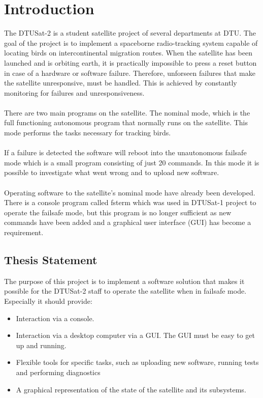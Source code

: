\chapter{Introduction}

The DTUSat-2 is a student satellite project of several departments at DTU. The goal of the project is to implement a spaceborne radio-tracking system capable of locating birds on intercontinental migration routes.
When the satellite has been launched and is orbiting earth, it is practically impossible to press a reset button in case of a hardware or software failure. Therefore, unforseen failures that make the satellite unresponsive, must be handled. This is achieved by constantly monitoring for failures and unresponsiveness.
\\ \\
There are two main programs on the satellite. The nominal mode, which is the full functioning autonomous program that normally runs on the satellite. This mode performs the tasks necessary for tracking birds.
\\ \\
If a failure is detected the software will reboot into the unautonomous failsafe mode which is a small program consisting of just 20 commands. In this mode it is possible to investigate what went wrong and to upload new software.
\\ \\
Operating software to the satellite's nominal mode have already been developed. There is a console program called fsterm which was used in DTUSat-1 project to operate the failsafe mode, but this program is no longer sufficient as new commands have been added and a graphical user interface (GUI) has become a requirement.

\section{Thesis Statement}
The purpose of this project is to implement a software solution that makes it possible for the DTUSat-2 staff to operate the satellite when in failsafe mode. Especially it should provide:
\begin{itemize}
\item Interaction via a console.
\item Interaction via a desktop computer via a GUI. The GUI must be easy to get up and running.
\item Flexible tools for specific tasks, such as uploading new software, running tests and performing diagnostics
\item A graphical representation of the state of the satellite and its subsystems.
\end{itemize}

